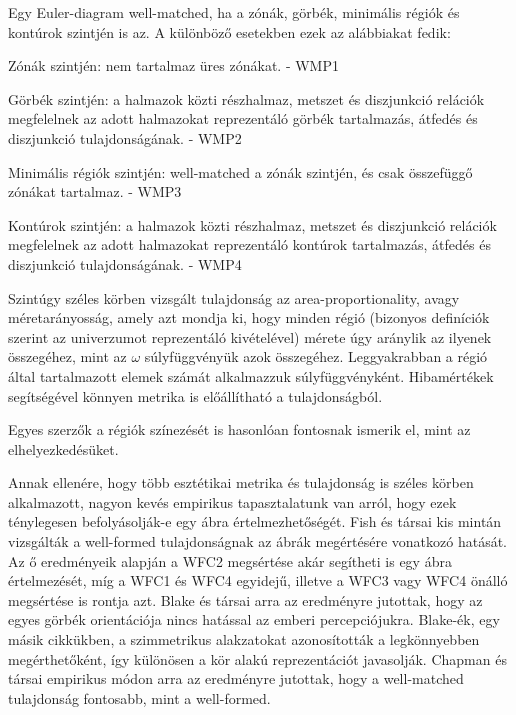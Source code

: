 Egy Euler-diagram well-matched, ha a zónák, görbék, minimális régiók és kontúrok szintjén is az. A különböző esetekben ezek az alábbiakat fedik:

\begin{compactenum}
	\item Zónák szintjén: nem tartalmaz üres zónákat. - WMP1
	\item Görbék szintjén: a halmazok közti részhalmaz, metszet és diszjunkció relációk megfelelnek az adott halmazokat reprezentáló görbék tartalmazás, átfedés és diszjunkció tulajdonságának. - WMP2
	\item Minimális régiók szintjén: well-matched a zónák szintjén, és csak összefüggő zónákat tartalmaz. - WMP3
	\item Kontúrok szintjén: a halmazok közti részhalmaz, metszet és diszjunkció relációk megfelelnek az adott halmazokat reprezentáló kontúrok tartalmazás, átfedés és diszjunkció tulajdonságának. - WMP4
\end{compactenum}

Szintúgy széles körben vizsgált tulajdonság az area-proportionality, avagy méretarányosság\cite{euler_with_circles, area_proportional_phd, drawing_area_proportional, general_area_proportional}, amely azt mondja ki, hogy minden régió (bizonyos definíciók szerint az univerzumot reprezentáló kivételével) mérete úgy aránylik az ilyenek összegéhez, mint az $\omega$ súlyfüggvényük azok összegéhez. Leggyakrabban a régió által tartalmazott elemek számát alkalmazzuk súlyfüggvényként. Hibamértékek segítségével könnyen metrika is előállítható a tulajdonságból.


Egyes szerzők a régiók színezését is hasonlóan fontosnak ismerik el, mint az elhelyezkedésüket\cite{imdb_euler, how_color_euler}.


Annak ellenére, hogy több esztétikai metrika és tulajdonság is széles körben alkalmazott, nagyon kevés empirikus tapasztalatunk van arról, hogy ezek ténylegesen befolyásolják-e egy ábra értelmezhetőségét. Fish és társai kis mintán vizsgálták\cite{euler_comprehension} a well-formed tulajdonságnak az ábrák megértésére vonatkozó hatását. Az ő eredményeik alapján a WFC2 megsértése akár segítheti is egy ábra értelmezését, míg a WFC1 és WFC4 egyidejű, illetve a WFC3 vagy WFC4 önálló megsértése is rontja azt. Blake és társai\cite{orientation_comprehension} arra az eredményre jutottak, hogy az egyes görbék orientációja nincs hatással az emberi percepciójukra. Blake-ék, egy másik cikkükben\cite{shape_comprehension}, a szimmetrikus alakzatokat azonosították a legkönnyebben megérthetőként, így különösen a kör alakú reprezentációt javasolják. Chapman és társai empirikus módon arra az eredményre jutottak\cite{wellmatched_important}, hogy a well-matched tulajdonság fontosabb, mint a well-formed.

